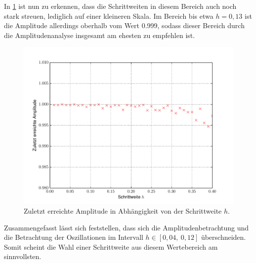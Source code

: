 In \cref{fig:Stabilitaet_Nah} ist nun zu erkennen, dass die Schrittweiten in diesem Bereich auch noch stark streuen, lediglich auf einer kleineren Skala.
Im Bereich bis etwa $h=0,13$ ist die Amplitude allerdings oberhalb vom Wert 0.999, sodass dieser Bereich durch die Amplitudenanalyse insgesamt am ehesten zu empfehlen ist.
\begin{figure}[H]
	\centering
	\includegraphics[width = \textwidth]{../Plots/Plot_2_B_Stabilitaet_Nah.pdf}
	\caption{Zuletzt erreichte Amplitude in Abhängigkeit von der Schrittweite $h$.\label{fig:Stabilitaet_Nah}}
\end{figure}
Zusammengefasst lässt sich feststellen, dass sich die Amplitudenbetrachtung und die Betrachtung der Oszillationen im Intervall $h\in[0,04,~0,12]$ überschneiden.
Somit scheint die Wahl einer Schrittweite aus diesem Wertebereich am sinnvollsten.